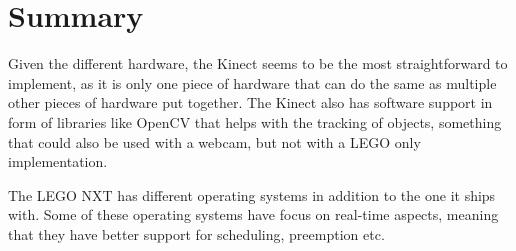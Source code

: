 \section{Summary}
Given the different hardware, the Kinect seems to be the most straightforward to implement, as it is only one piece of hardware that can do the same as multiple other pieces of hardware put together. The Kinect also has software support in form of libraries like OpenCV that helps with the tracking of objects, something that could also be used with a webcam, but not with a LEGO only implementation.

The LEGO NXT has different operating systems in addition to the one it ships with. Some of these operating systems have focus on real-time aspects, meaning that they have better support for scheduling, preemption etc.